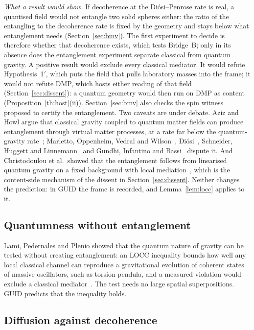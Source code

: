 \emph{What a result would show.} If decoherence at the Di\'osi--Penrose rate is real, a quantised field would not entangle two solid
spheres either: the ratio of the entangling to the decoherence rate is fixed by the geometry and stays below what entanglement needs
(Section~\ref{sec:bmv}). The first experiment to decide is therefore whether that decoherence exists, which tests Bridge~B; only in its
absence does the entanglement experiment separate classical from quantum gravity. A positive result would exclude every classical
mediator. It would refute Hypothesis~1$'$, which puts the field that pulls laboratory masses into the frame; it would not refute DMP,
which hosts either reading of that field (Section~\ref{sec:dissent}): a quantum geometry would then run on DMP as content
(Proposition~\ref{th:host}(ii)). Section~\ref{sec:bmv} also checks the spin witness proposed to certify the entanglement. Two
caveats are under debate. Aziz and Howl argue that classical gravity coupled to quantum matter fields can produce entanglement through virtual matter
processes, at a rate far below the quantum-gravity rate~\cite{azizhowl}; Marletto, Oppenheim, Vedral and Wilson~\cite{movw},
Di\'osi~\cite{diosi25}, Schneider, Huggett and Linnemann~\cite{shl} and Gundhi, Infantino and Bassi~\cite{gib} dispute it. And
Christodoulou et al.\ showed that the entanglement follows from linearised quantum gravity on a fixed background with local
mediation~\cite{christodoulou23}, which is the content-side mechanism of the dissent in Section~\ref{sec:dissent}. Neither changes the prediction:
in GUID the frame is recorded, and Lemma~\ref{lem:locc} applies to it.

\subsection{Quantumness without entanglement}

Lami, Pedernales and Plenio showed that the quantum nature of gravity can be tested without creating entanglement: an LOCC inequality bounds
how well any local classical channel can reproduce a gravitational evolution of coherent states of massive oscillators, such as torsion
pendula, and a measured violation would exclude a classical mediator~\cite{lpp}. The test needs no large spatial superpositions. GUID
predicts that the inequality holds.

\subsection{Diffusion against decoherence}

